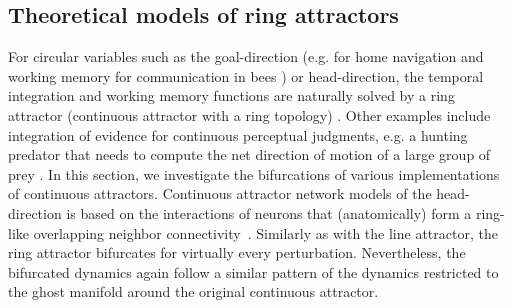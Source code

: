 \documentclass{article} %
\newcounter{ct}
\theoremstyle{definition}
\theoremstyle{remark}
\begin{document}
\subsection{Theoretical models of ring attractors}\label{sec:ras}

For circular variables such as the goal-direction (e.g. for home navigation and working memory for communication	 in bees \citep{frisch1993dance}) %
or head-direction, the temporal integration and working memory functions are naturally solved by a ring attractor (continuous attractor with a ring topology) \citep{kim2019generation, turner2017angular, turner2020neuroanatomical,hulse2020mechanisms,taube2007head}.
Other examples include
integration of evidence for continuous perceptual judgments, e.g. a hunting predator that needs to compute the net direction of motion of a large group of prey \citep{esnaola2022flexible}.
In this section, we investigate the bifurcations of various implementations of continuous attractors.
Continuous attractor network models of the head-direction is based on the interactions of neurons that (anatomically) form a ring-like overlapping neighbor connectivity~\citep{zhang1996,Noorman2022,ajabi2023,vafidis2022,boucheny2005continuous,knierim2012}.
Similarly as with the line attractor, the ring attractor bifurcates for virtually every perturbation.
Nevertheless, the bifurcated dynamics again follow a similar pattern of the dynamics restricted to the ghost manifold around the original continuous attractor.
\end{document}
